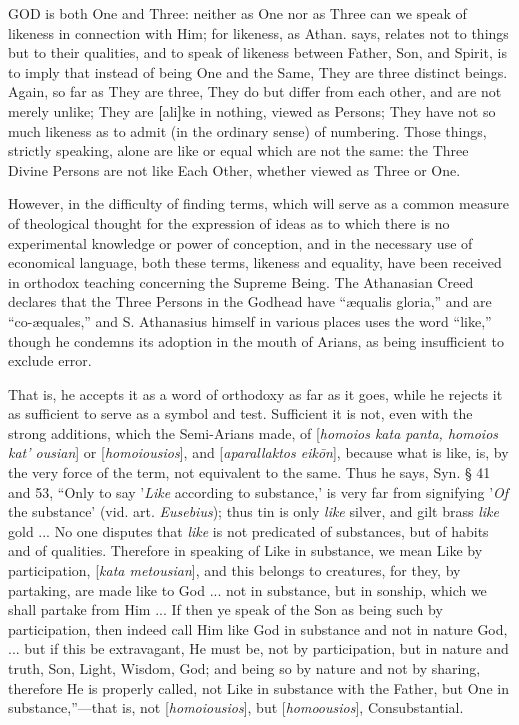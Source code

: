 GOD
is both One and Three: neither as One nor as Three can we speak of
likeness in connection with Him; for likeness, as Athan. says, relates
not to things but to their qualities, and to speak of likeness between
Father, Son, and Spirit, is to imply that instead of being One and the
Same, They are three distinct beings. Again, so far as They are three,
They do but differ from each other, and are not merely unlike; They
are \textbf{[}ali\textbf{]}ke
in nothing, viewed as Persons; They have not so much likeness as to
admit (in the ordinary sense) of numbering. Those things, strictly
speaking, alone are like or equal which are not the same: the Three
Divine Persons are not like Each Other, whether viewed as Three or
One.

However, in the difficulty of finding terms,
which will serve as a common measure of theological thought for the
expression of ideas as to which there is no experimental knowledge or
power of conception, and in the necessary use of economical language,
both these terms, likeness and equality, have been received in
orthodox teaching concerning the Supreme Being. The Athanasian Creed
declares that the Three Persons in the Godhead have ``æqualis gloria,''
and are ``co-æquales,'' and S. Athanasius himself in various places
uses the word ``like,'' though he condemns its adoption in the
mouth of Arians, as being insufficient to exclude error.

That is, he accepts it as a word of orthodoxy as
far as it goes, while he rejects it as sufficient to serve as a symbol
and test. Sufficient it is not, even with the strong additions, which
the Semi-Arians made, of [\emph{homoios kata panta, homoios kat'
ousian}] or [\emph{homoiousios}], and [\emph{aparallaktos eik\={o}n}],
because what is like, is, by the very force of the term, not
equivalent to the same. Thus he says, Syn. § 41 and 53, ``Only to say
'\emph{Like} according to substance,' is very far from signifying '\emph{Of}
the substance' (vid. art. \emph{Eusebius}); thus tin is only \emph{like}
silver, and gilt brass \emph{like} gold ... No one disputes that \emph{like}
is not predicated of substances, but of habits and of qualities.
Therefore in speaking of Like in substance, we mean Like by
participation, [\emph{kata metousian}], and this belongs to creatures,
for they, by partaking, are made like to God ... not in substance, but
in sonship, which we shall partake from Him ... If then ye speak of
the Son as being such by participation, then indeed call Him like God
in substance and not in nature God, ... but if this be extravagant, He
must be, not by participation, but in nature and truth, Son, Light,
Wisdom, God; and being so by nature and not by sharing, therefore He
is properly called, not Like in substance with the Father, but One in
substance,''—that is, not [\emph{homoiousios}], but [\emph{homoousios}],
Consubstantial.

